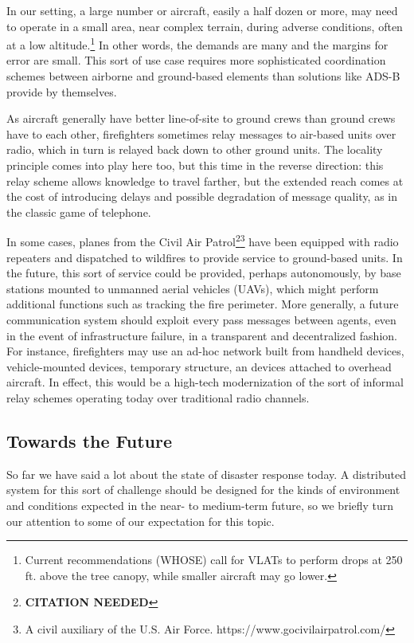 \documentclass[]             %
{NASA}                       %
\theoremstyle{definition}
\newcommand{\citationneeded}{\footnote{\textbf{CITATION NEEDED}}}
\begin{document}
In our setting, a large number or aircraft, easily a half dozen or
more, may need to operate in a small area, near complex terrain,
during adverse conditions, often at a low altitude.\footnote{Current
recommendations (WHOSE) call for VLATs to perform drops at 250
ft. above the tree canopy, while smaller aircraft may go lower.} In
other words, the demands are many and the margins for error are
small. This sort of use case requires more sophisticated coordination
schemes between airborne and ground-based elements than solutions like
ADS-B provide by themselves.

As aircraft generally have better line-of-site to ground crews than
ground crews have to each other, firefighters sometimes relay messages
to air-based units over radio, which in turn is relayed back down to
other ground units. The locality principle comes into play here too, but
this time in the reverse direction: this relay scheme allows knowledge
to travel farther, but the extended reach comes at the cost of
introducing delays and possible degradation of message quality, as in
the classic game of telephone.

In some cases, planes from the Civil Air
Patrol\citationneeded\footnote{A civil auxiliary of the U.S. Air
Force. https://www.gocivilairpatrol.com/} have been equipped with
radio repeaters and dispatched to wildfires to provide service to
ground-based units. In the future, this sort of service could be
provided, perhaps autonomously, by base stations mounted to unmanned
aerial vehicles (UAVs), which might perform additional functions such
as tracking the fire perimeter. More generally, a future communication
system should exploit every pass messages between agents, even in the
event of infrastructure failure, in a transparent and decentralized
fashion. For instance, firefighters may use an ad-hoc network built
from handheld devices, vehicle-mounted devices, temporary structure,
an devices attached to overhead aircraft.  In effect, this would be a
high-tech modernization of the sort of informal relay schemes
operating today over traditional radio channels.

\subsection{Towards the Future}\label{towards-the-future}

So far we have said a lot about the state of disaster response
today. A distributed system for this sort of challenge should be
designed for the kinds of environment and conditions expected in the
near- to medium-term future, so we briefly turn our attention to some
of our expectation for this topic.
\end{document}
